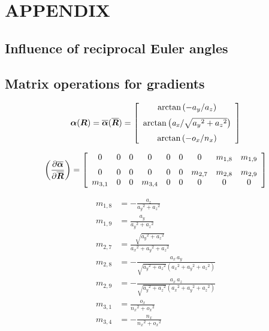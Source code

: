 \documentclass[twocolumn,10pt]{IFTOMM}
\newcommand{\bm}[1]{\boldsymbol{#1}}
\begin{document}
\section*{APPENDIX}

\subsection{Influence of reciprocal Euler angles}

\subsection{Matrix operations for gradients}

\begin{equation}
\bm{\alpha}(\bm{R})
=
\overline{\bm{\alpha}}(\overline{\bm{R}})
=
\left[ \begin {array}{c} \arctan \left( -{a_y}/{a_z}
\right) \\ \noalign{\medskip}\arctan \left( {\it a_x}/\sqrt {{{ 
            a_y}}^{2}+{{ a_z}}^{2}} \right) \\ \noalign{\medskip}\arctan
\left( -{ o_x}/{ n_x} \right) \end {array} \right] 
\end{equation}

\begin{equation}
\left(\frac{\partial \overline{\bm{\alpha}}}{\partial \overline{\bm{R}}}\right)
=
\left[ \begin {array}{ccccccccc} 0&0&0&0&0&0&0&m_{1,8}&m_{1,9}\\ 
\noalign{\medskip}0&0&0&0&0&0&m_{2,7}&m_{2,8}&m_{2,9}\\ 
m_{3,1}&0&0&m_{3,4}&0&0&0&0&0\end {array} \right] 
\end{equation}

\begin{align}
m_{1,8}&=-{\frac {{ a_z}}{{
            { a_y}}^{2}+{{ a_z}}^{2}}}\\
m_{1,9}&={\frac {{ a_y}}{{{ a_y}}^{2
        }+{{ a_z}}^{2}}}\\
m_{2,7}&={\frac {\sqrt {{{
                    a_y}}^{2}+{{ a_z}}^{2}}}{{{ a_x}}^{2}+{{ a_y}}^{2}+{{
                a_z}}^{2}}} \\
m_{2,8}&=-{\frac {{ a_x}\,{ a_y}}{\sqrt {{{ a_y}}^
            {2}+{{ a_z}}^{2}} \left( {{ a_x}}^{2}+{{ a_y}}^{2}+{{ 
                a_z}}^{2} \right) }}\\
m_{2,9}&=-{\frac {{ a_x}\,{ a_z}}{\sqrt {{{ 
                    a_y}}^{2}+{{ a_z}}^{2}} \left( {{ a_x}}^{2}+{{ a_y}}^{2}+
        {{ a_z}}^{2} \right) }}\\
m_{3,1}&=\frac {{ o_x}}{{{
            n_x}}^{2}+{{ o_x}}^{2}} \\
m_{3,4}&=-{\frac {{ n_x}}{{{ n_x}
        }^{2}+{{ o_x}}^{2}}}
\end{align}
\end{document}
